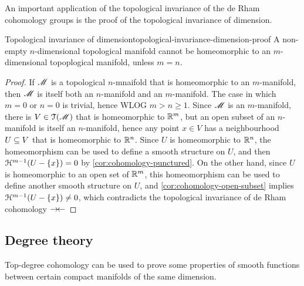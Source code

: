 An important application of the topological invariance of the de Rham cohomology groups is the proof of the topological invariance of dimension.

\begin{theorem}{Topological invariance of dimension}{topological-invariance-dimension-proof}
  A non-empty $ n $-dimensional topological manifold cannot be homeomorphic to an $ m $-dimensional topoplogical manifold, unless $ m = n $.
\end{theorem}

\begin{proofbox}
  \begin{proof}
    If $ \mathscr{M} $ is a topological $ n $-mnaifold that is homeomorphic to an $ m $-manifold, then $ \mathscr{M} $ is itself both an $ n $-manifold and an $ m $-manifold. The case in which $ m = 0 $ or $ n = 0 $ is trivial, hence WLOG $ m > n \geq 1 $. Since $ \mathscr{M} $ is an $ m $-manifold, there is $ V \in \EuScript{T}(\mathscr{M}) $ that is homeomorphic to $ \mathbb{R}^m $, but an open subset of an $ n $-manifold is itself an $ n $-manifold, hence any point $ x \in V $ has a neighbourhood $ U \subseteq V $ that is homeomorphic to $ \mathbb{R}^n $. Since $ U $ is homeomorphic to $ \mathbb{R}^n $, the homeomorphism can be used to define a smooth structure on $ U $, and then $ \EuScript{H}^{m-1}(U - \{x\}) = 0 $ by \cref{cor:cohomology-punctured}. On the other hand, since $ U $ is homeomorphic to an open set of $ \mathbb{R}^m $, this homeomorphism can be used to define another smooth structure on $ U $, and \cref{cor:cohomology-open-subset} implies $ \EuScript{H}^{m-1}(U - \{x\}) \neq 0 $, which contradicts the topological invariance of de Rham cohomology $ \rightarrow \hspace{-0.15em} \leftarrow $
  \end{proof}
\end{proofbox}

\subsection{Degree theory}

Top-degree cohomology can be used to prove some properties of smooth functions between certain compact manifolds of the same dimension.

